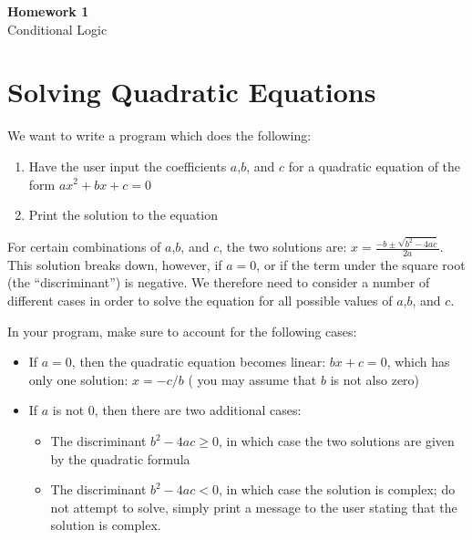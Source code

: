 \documentclass{article}
\begin{document}
\fancyfoot[C]{\thepage}
\vspace*{0cm}
\begin{center}
	{\LARGE \textbf{Homework 1}}\\
	\vspace{.25cm}
	{\Large Conditional Logic}
\end{center}

\section*{Solving Quadratic Equations}
We want to write a program which does the following:
\begin{enumerate}
	\item Have the user input the coefficients $a$,$b$, and $c$ for a quadratic equation of the form $ax^2+bx+c=0$
	\item Print the solution to the equation
\end{enumerate}
For certain combinations of $a$,$b$, and $c$, the two solutions are: $x=\frac{-b\pm\sqrt{b^2-4ac}}{2a}$. This solution breaks down, however, if $a=0$, or if the term under the square root (the ``discriminant'') is negative. We therefore need to consider a number of different cases in order to solve the equation for all possible values of $a$,$b$, and $c$.

In your program, make sure to account for the following cases:

\begin{itemize}
	\item If $a=0$, then the quadratic equation becomes linear: $bx+c=0$, which has only one solution: $x=-c/b$ ( you may assume that $b$ is not also zero)
	\item If $a$ is not $0$, then there are two additional cases:
	\begin{itemize}
		\item The discriminant $b^2-4ac\geq0$, in which case the two solutions are given by the quadratic formula
		\item The discriminant $b^2-4ac<0$, in which case the solution is complex; do not attempt to solve, simply print a message to the user stating that the solution is complex.
	\end{itemize}
\end{itemize}
\end{document}
